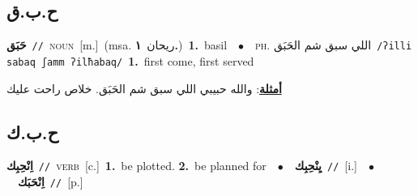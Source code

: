 \documentclass[10pt,a4paper,twoside]{article} %
\begin{document}
\begin{multicols}{2}
{{{{{\vspace{-3mm}
\subsection*{\color{blue}\foreignlanguage{arabic}{ح.ب.ق}\color{blue}{}} 

{\setlength\topsep{0pt}\textbf{\foreignlanguage{arabic}{حَبَق}}\ {\color{gray}\texttt{//}\color{black}}\ \textsc{noun}\ [m.]\ \color{gray}(msa. \foreignlanguage{arabic}{ريحان}~\foreignlanguage{arabic}{\textbf{١.}})\color{black}\ \textbf{1.}~basil\ \ $\bullet$\ \ \textsc{ph.} \color{gray} \foreignlanguage{arabic}{اللي سبق شم الحَبَق}\color{black}\ {\color{gray}\texttt{/{\sffamily ʔilli sabaq ʃamm ʔilħabaq}/}\color{black}}\ \textbf{1.}~first come, first served\  \begin{flushright}\color{gray}\foreignlanguage{arabic}{\textbf{\underline{\foreignlanguage{arabic}{أمثلة}}}: والله حبيبي اللي سبق شم الحَبَق. خلاص راحت عليك}\end{flushright}\color{black}} \vspace{2mm}

\vspace{-3mm}
\subsection*{\color{blue}\foreignlanguage{arabic}{ح.ب.ك}\color{blue}{}} 

{\setlength\topsep{0pt}\textbf{\foreignlanguage{arabic}{اِنْحِبِك}}\ {\color{gray}\texttt{//}\color{black}}\ \textsc{verb}\ [c.]\ \textbf{1.}~be plotted.  \textbf{2.}~be planned for\ \ $\bullet$\ \ \setlength\topsep{0pt}\textbf{\foreignlanguage{arabic}{يِنْحِبِك}}\ {\color{gray}\texttt{//}\color{black}}\ [i.]\ \ $\bullet$\ \ \setlength\topsep{0pt}\textbf{\foreignlanguage{arabic}{اِنْحَبَك}}\ {\color{gray}\texttt{//}\color{black}}\ [p.]\ 

}}}}}}
\end{multicols}
\end{document}

